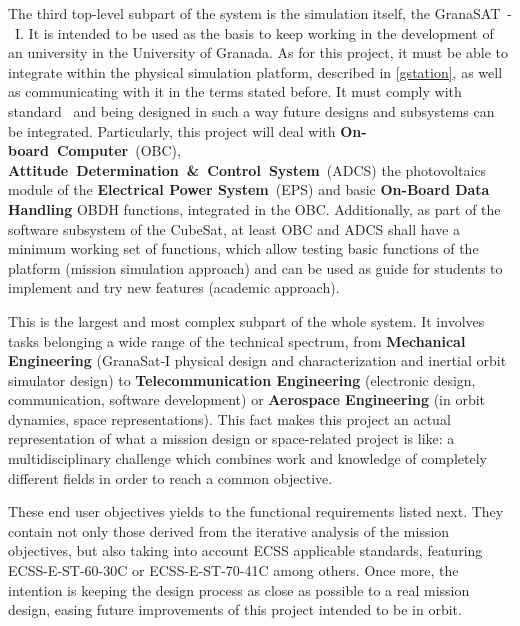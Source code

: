The third top-level subpart of the system is the simulation  itself, the GranaSAT~-~I. It is intended to be used as the basis to keep working in the development of an university  in the University of Granada. As for this project, it must be able to integrate within the physical simulation platform, described in \autoref{gstation}, as well as communicating with it in the terms stated before. It must comply with  standard~\cite{calpoly} and being designed in such a way future designs and subsystems can be integrated. Particularly, this project will deal with \textbf{On-board~Computer}~(\acrshort{OBC}), \textbf{Attitude~Determination~\&~Control~System}~(\acrshort{ADCS}) the photovoltaics module of the \textbf{Electrical Power System}~(\acrshort{EPS}) and basic \textbf{On-Board Data Handling} \acrshort{OBDH} functions, integrated in the \acrshort{OBC}. Additionally, as part of the software subsystem of the CubeSat, at least \acrshort{OBC} and \acrshort{ADCS} shall have a minimum working set of functions, which allow testing basic functions of the platform (mission simulation approach) and can be used as guide for students to implement and try new features (academic approach).

This is the largest and most complex subpart of the whole system. It involves tasks belonging a wide range of the technical spectrum, from \textbf{Mechanical Engineering} (GranaSat-I physical design and characterization and inertial orbit simulator design) to \textbf{Telecommunication Engineering} (electronic design, communication, software development) or \textbf{Aerospace Engineering }(in orbit dynamics, space representations). This fact makes this project an actual representation of what a mission design or space-related project is like: a multidisciplinary challenge which	combines work and knowledge of completely different fields in order to reach a common objective. 

These end user objectives yields to the functional requirements listed next. They contain not only those derived from the iterative analysis of the mission objectives, but also taking into account \acrshort{ECSS} applicable standards, featuring ECSS-E-ST-60-30C \cite{ESAAOCS} or \linebreak ECSS-E-ST-70-41C \cite{ESATLM} among others. Once more, the intention is keeping the design process as close as possible to a real mission design, easing future improvements of this project intended to be in orbit.

 

